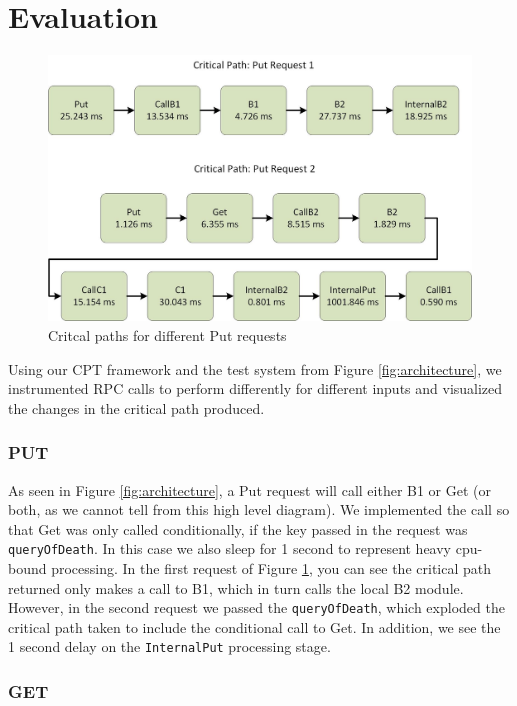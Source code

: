 \documentclass[11pt, twoside, twocolumn]{extarticle}
\begin{document}
\section{Evaluation}

\begin{figure}[h]
\centering
\includegraphics[width=\linewidth]{evaluation.jpg}
\caption[width=\linewidth]{Critcal paths for different Put requests}
\label{eval_put}
\end{figure}

Using our CPT framework and the test system from Figure \ref{fig:architecture}, we instrumented RPC calls to perform differently for different inputs and visualized the changes in the critical path produced. 

\subsubsection*{PUT}

As seen in Figure \ref{fig:architecture}, a Put request will call either B1 or Get (or both, as we cannot tell from this high level diagram). We implemented the call so that Get was only called conditionally, if the key passed in the request was \lstinline{queryOfDeath}. In this case we also sleep for 1 second to represent heavy cpu-bound processing.  In the first request of Figure \ref{eval_put}, you can see the critical path returned only makes a call to B1, which in turn calls the local B2 module.  However, in the second request we passed the \lstinline{queryOfDeath}, which exploded the critical path taken to include the conditional call to Get.  In addition, we see the 1 second delay on the \lstinline{InternalPut} processing stage.

\subsubsection*{GET}
\end{document}
